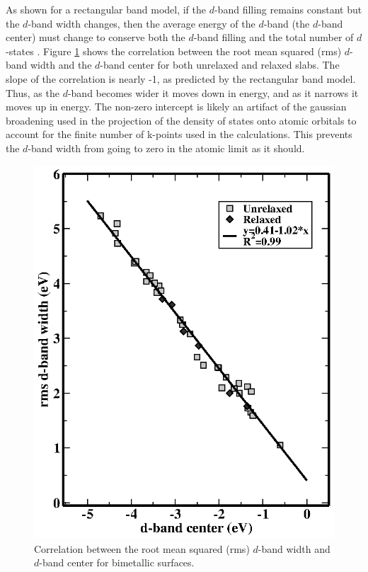 \documentclass[aps,prl,twocolumn,superscriptaddress,showkeys]{revtex4}
\begin{document}
As shown for a rectangular band model, if the $d$-band filling remains
constant but the $d$-band width changes, then the average energy of the
$d$-band (the $d$-band center) must change to conserve both the $d$-band
filling and the total number of $d$-states
\cite{kitchin2004:_modif_surfac_elect_chemic_proper}. Figure
\ref{fig:momentcorrelations} shows the correlation between the root
mean squared (rms) $d$-band width and the $d$-band center for both
unrelaxed and relaxed slabs. The slope of the correlation is
nearly -1, as predicted by the rectangular band
model. Thus, as the $d$-band becomes wider it moves down in energy,
and as it narrows it moves up in energy. The non-zero intercept is
likely an artifact of the gaussian broadening used in the projection
of the density of states onto atomic orbitals to account for the
finite number of k-points used in the calculations. This prevents the
$d$-band width from going to zero in the atomic limit as it should.

\begin{figure}
\includegraphics{Fig1}
\caption{Correlation between the root mean squared (rms) $d$-band width
  and $d$-band center for bimetallic surfaces.\label{fig:momentcorrelations}}
\end{figure}
\end{document}
